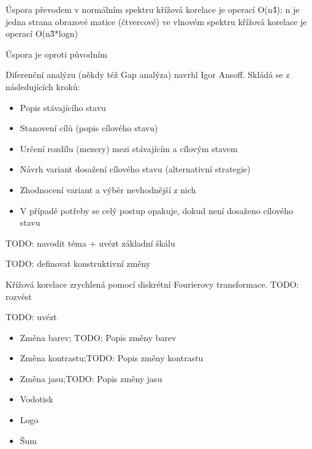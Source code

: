Úspora převodem 
v normálním spektru křížová korelace je operací O(n\^4); n je jedna strana obrazové matice (čtvercové)
ve vlnovém spektru křížová korelace je operací O(n\^3*logn)

Úspora je oproti původním 


Diferenční analýzu (někdy též Gap analýza) navrhl Igor Ansoff. Skládá se z následujících kroků:
\begin{itemize}
	\setlength{\parskip}{0pt}
	\setlength{\itemsep}{0pt}
	\item{Popis stávajícího stavu}
	\item{Stanovení cílů (popis cílového stavu)}
	\item{Určení rozdílu (mezery) mezi stávajícím a cílovým stavem}
	\item{Návrh variant dosažení cílového stavu (alternativní strategie)}
	\item{Zhodnocení variant a výběr nevhodnější z nich}
	\item{V případě potřeby se celý postup opakuje, dokud není dosaženo cílového stavu}
\end{itemize}

TODO: navodit téma + uvézt základní škálu

TODO: definovat konstruktivní změny

Křížová korelace zrychlená pomocí diskrétní Fourierovy transformace.
TODO: rozvést

TODO: uvézt

\begin{itemize}
	\setlength{\parskip}{0pt}
	\setlength{\itemsep}{0pt}
	\item{Změna barev; TODO: Popis změny barev}
	\item{Změna kontrastu;TODO: Popis změny kontrastu}
	\item{Změna jasu;TODO: Popis změny jasu}
\end{itemize}

\begin{itemize}
	\setlength{\parskip}{0pt}
	\setlength{\itemsep}{0pt}
	\item{Vodotisk}
	\item{Logo}
	\item{Šum}
\end{itemize}


